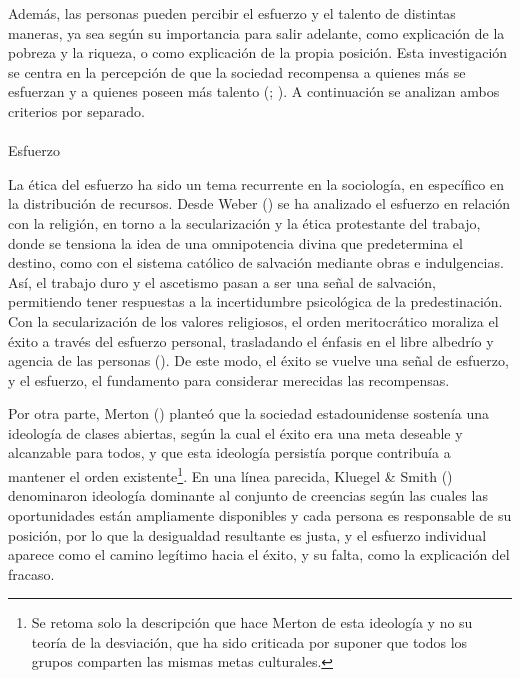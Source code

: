 \documentclass[
  spanish,
  a4paper,
  oneside]{scrbook}
\makeatletter
\let\oldparagraph\paragraph
\renewcommand{\paragraph}{
    \@ifstar
      \xxxParagraphStar
      \xxxParagraphNoStar
  }
\newcommand{\xxxParagraphStar}[1]{\oldparagraph*{#1}\mbox{}}
\newcommand{\xxxParagraphNoStar}[1]{\oldparagraph{#1}\mbox{}}
\makeatother
\begin{document}
Además, las personas pueden percibir el esfuerzo y el talento de
distintas maneras, ya sea según su importancia para salir adelante, como
explicación de la pobreza y la riqueza, o como explicación de la propia
posición. Esta investigación se centra en la percepción de que la
sociedad recompensa a quienes más se esfuerzan y a quienes poseen más
talento (; ).
A continuación se analizan ambos criterios por separado.

\paragraph{Esfuerzo}\label{esfuerzo}

La ética del esfuerzo ha sido un tema recurrente en la sociología, en
específico en la distribución de recursos. Desde Weber
() se ha analizado el esfuerzo en
relación con la religión, en torno a la secularización y la ética
protestante del trabajo, donde se tensiona la idea de una omnipotencia
divina que predetermina el destino, como con el sistema católico de
salvación mediante obras e indulgencias. Así, el trabajo duro y el
ascetismo pasan a ser una señal de salvación, permitiendo tener
respuestas a la incertidumbre psicológica de la predestinación. Con la
secularización de los valores religiosos, el orden meritocrático
moraliza el éxito a través del esfuerzo personal, trasladando el énfasis
en el libre albedrío y agencia de las personas
(). De este
modo, el éxito se vuelve una señal de esfuerzo, y el esfuerzo, el
fundamento para considerar merecidas las recompensas.

Por otra parte, Merton () planteó
que la sociedad estadounidense sostenía una ideología de clases
abiertas, según la cual el éxito era una meta deseable y alcanzable para
todos, y que esta ideología persistía porque contribuía a mantener el
orden existente\footnote{Se retoma solo la descripción que hace Merton
  de esta ideología y no su teoría de la desviación, que ha sido
  criticada por suponer que todos los grupos comparten las mismas metas
  culturales.}. En una línea parecida, Kluegel \& Smith
() denominaron ideología
dominante al conjunto de creencias según las cuales las oportunidades
están ampliamente disponibles y cada persona es responsable de su
posición, por lo que la desigualdad resultante es justa, y el esfuerzo
individual aparece como el camino legítimo hacia el éxito, y su falta,
como la explicación del fracaso.
\end{document}
